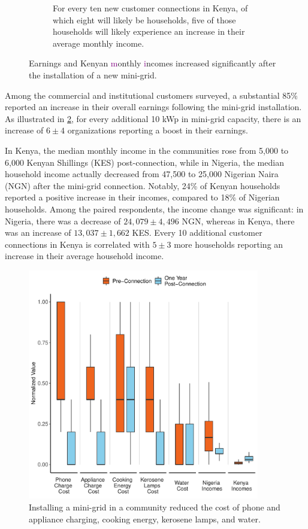 \begin{figure}[t]
\begin{subfigure}[t]{0.48\textwidth}
		\caption{For every ten new customer connections in Kenya, of which eight will likely be households, five of those households will likely experience an increase in their average monthly income.}
		\label{fig:kenya_incomes}
	\end{subfigure}
	\caption{Earnings and Kenyan \textcolor{purple}{m}onthly \textcolor{purple}{i}ncomes increased significantly after the installation of a new mini-grid.}
	\label{fig:economic_improvement}
\end{figure}
Among the commercial and institutional customers surveyed, a substantial 85\% reported an increase in their overall earnings following the mini-grid installation. As illustrated in \cref{fig:economic_improvement}, for every additional 10 kWp in mini-grid capacity, there is an increase of $6\pm4$ organizations reporting a boost in their earnings. 

In Kenya, the median monthly income in the communities rose from 5,000 to 6,000 Kenyan Shillings (KES) post-connection, while in Nigeria, the median household income actually decreased from 47,500 to 25,000 Nigerian Naira (NGN) after the mini-grid connection. Notably, 24\% of Kenyan households reported a positive increase in their incomes, compared to 18\% of Nigerian households. Among the paired respondents, the income change was significant: in Nigeria, there was a decrease of $24,079\pm4,496$ NGN, whereas in Kenya, there was an increase of $13,037\pm1,662$ KES. Every 10 additional customer connections in Kenya is correlated with $5\pm3$ more households reporting an increase in their average household income.

\begin{figure}[t]
	\centering
	\includegraphics[width=0.9\textwidth]{images/economic_activity_paired_results.pdf}
	\caption{Installing a mini-grid in a community reduced the cost of phone and appliance charging, cooking energy, kerosene lamps, and water.}
	\label{fig:economic_paired_results}
\end{figure}


